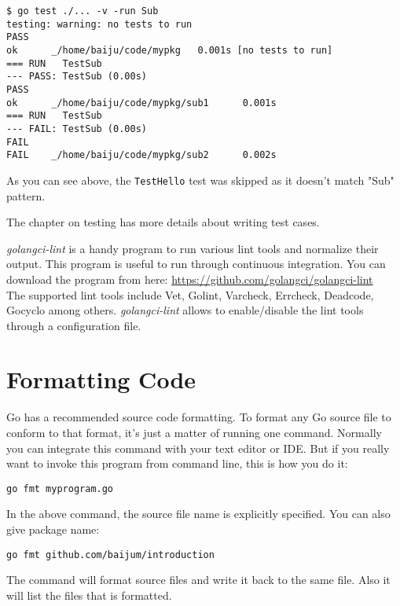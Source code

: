 \begin{lstlisting}[numbers=none]
$ go test ./... -v -run Sub
testing: warning: no tests to run
PASS
ok      _/home/baiju/code/mypkg   0.001s [no tests to run]
=== RUN   TestSub
--- PASS: TestSub (0.00s)
PASS
ok      _/home/baiju/code/mypkg/sub1      0.001s
=== RUN   TestSub
--- FAIL: TestSub (0.00s)
FAIL
FAIL    _/home/baiju/code/mypkg/sub2      0.002s
\end{lstlisting}

As you can see above, the \texttt{TestHello} test was skipped as it
doesn't match "Sub" pattern.

The chapter on testing has more details about writing test cases.

\textit{golangci-lint} is a handy program to run various lint tools and
normalize their output. This program is useful to run through continuous
integration. You can download the program from here:
\url{https://github.com/golangci/golangci-lint}\\

The supported lint tools include Vet, Golint, Varcheck, Errcheck, Deadcode,
Gocyclo among others. \textit{golangci-lint} allows to enable/disable the lint
tools through a configuration file.

\section{Formatting Code}

Go has a recommended source code formatting.  To
format any Go source file to conform to that format, it's just a
matter of running one command.  Normally you can integrate this
command with your text editor or IDE.  But if you really want to
invoke this program from command line, this is how you do it:

\begin{lstlisting}[numbers=none]
go fmt myprogram.go
\end{lstlisting}

In the above command, the source file name is explicitly specified.
You can also give package name:

\begin{lstlisting}[numbers=none]
go fmt github.com/baijum/introduction
\end{lstlisting}

The command will format source files and write it back to the same
file. Also it will list the files that is formatted.

